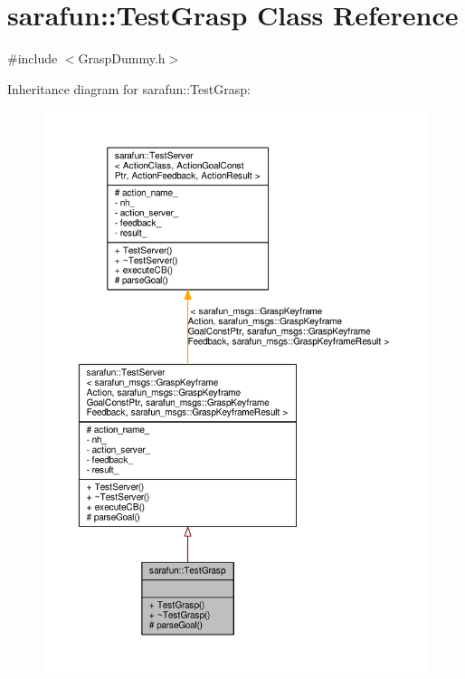 \hypertarget{classsarafun_1_1TestGrasp}{\section{sarafun\-:\-:Test\-Grasp Class Reference}
\label{classsarafun_1_1TestGrasp}
}


{\ttfamily \#include $<$Grasp\-Dummy.\-h$>$}



Inheritance diagram for sarafun\-:\-:Test\-Grasp\-:
\nopagebreak
\begin{figure}[H]
\begin{center}
\leavevmode
\includegraphics[width=350pt]{da/d2a/classsarafun_1_1TestGrasp__inherit__graph}
\end{center}
\end{figure}


